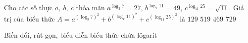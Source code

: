 	\begin{ex}
		Cho các số thực $a,\ b,\ c$ thỏa mãn $a^{\log_3 7} = 27$, $b^{\log_7 11} = 49$, $c^{\log_{11} 25} =\sqrt{11}$. Giá trị của biểu thức $A=a^{\left( \log_3 7 \right)^2} + b^{\left( \log_7 11 \right)^2} + c^{\left( \log_{11} 25 \right)^2}$ là
		\choice
		{$129$}
		{$519$}
		{\True $469$}
		{$729$}
	\end{ex}

\begin{dang}{Biến đổi, rút gọn, biểu diễn biểu thức chứa lôgarít}
\end{dang}
